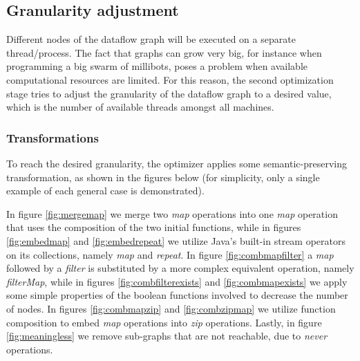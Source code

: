 \documentclass[sigplan,review,anonymous]{acmart}\settopmatter{printfolios=true,printacmref=false}
\begin{document}

\subsection{Granularity adjustment}

Different nodes of the dataflow graph will be executed on a separate thread/process. The fact that graphs can grow very big, for instance when programming a big swarm of millibots\cite{army}, poses a problem when available computational resources are limited. For this reason, the second optimization stage tries to adjust the granularity of the dataflow graph to a desired value, which is the number of available threads amongst all machines.

\subsubsection{Transformations}

To reach the desired granularity, the optimizer applies some semantic-preserving transformation, as shown in the figures below (for simplicity, only a single example of each general case is demonstrated).


\newpage
In figure \ref{fig:mergemap} we merge two \textit{map} operations into one \textit{map} operation that uses the composition of the two initial functions, while in figures \ref{fig:embedmap} and \ref{fig:embedrepeat} we utilize Java's built-in stream operators on its collections, namely \textit{map} and \textit{repeat}. In figure \ref{fig:combmapfilter} a \textit{map} followed by a \textit{filter} is substituted by a more complex equivalent operation, namely \textit{filterMap}, while in figures \ref{fig:combfilterexists} and \ref{fig:combmapexists} we apply some simple properties of the boolean functions involved to decrease the number of nodes. In figures \ref{fig:combmapzip} and \ref{fig:combzipmap} we utilize function composition to embed \textit{map} operations into \textit{zip} operations. Lastly, in figure \ref{fig:meaningless} we remove sub-graphs that are not reachable, due to \textit{never} operations.
\end{document}
